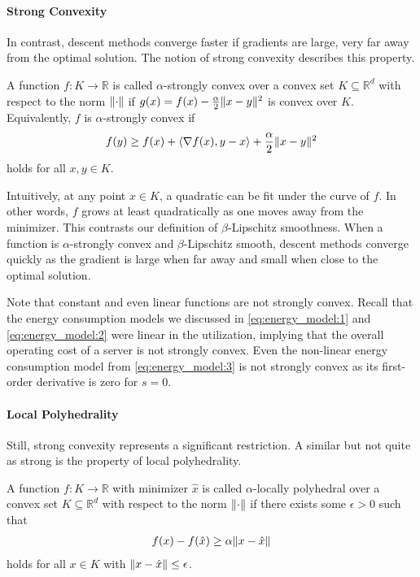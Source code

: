 \paragraph{Strong Convexity} In contrast, descent methods converge faster if gradients are large, very far away from the optimal solution. The notion of strong convexity describes this property.

\begin{definition}
\cite{Gupta2020} A function $f : K \to \mathbb{R}$ is called $\alpha$-strongly convex over a convex set $K \subseteq \mathbb{R}^d$ with respect to the norm $\lVert\cdot\rVert$ if $g(x) = f(x) - \frac{\alpha}{2}\lVert x-y\rVert^2$ is convex over $K$. Equivalently, $f$ is $\alpha$-strongly convex if \begin{align*}
    f(y) \geq f(x) + \langle\nabla f(x), y-x\rangle + \frac{\alpha}{2}\lVert x-y\rVert^2
\end{align*} holds for all $x, y \in K$.
\end{definition}

Intuitively, at any point $x \in K$, a quadratic can be fit under the curve of $f$. In other words, $f$ grows at least quadratically as one moves away from the minimizer. This contrasts our definition of $\beta$-Lipschitz smoothness. When a function is $\alpha$-strongly convex and $\beta$-Lipschitz smooth, descent methods converge quickly as the gradient is large when far away and small when close to the optimal solution.

Note that constant and even linear functions are not strongly convex. Recall that the energy consumption models we discussed in \cref{eq:energy_model:1} and \cref{eq:energy_model:2} were linear in the utilization, implying that the overall operating cost of a server is not strongly convex. Even the non-linear energy consumption model from \cref{eq:energy_model:3} is not strongly convex as its first-order derivative is zero for $s = 0$.

\paragraph{Local Polyhedrality} Still, strong convexity represents a significant restriction. A similar but not quite as strong is the property of local polyhedrality.

\begin{definition}
\cite{Goel2018} A function $f : K \to \mathbb{R}$ with minimizer $\hat{x}$ is called $\alpha$-locally polyhedral over a convex set $K \subseteq \mathbb{R}^d$ with respect to the norm $\lVert\cdot\rVert$ if there exists some $\epsilon > 0$ such that \begin{align*}
    f(x) - f(\hat{x}) \geq \alpha \lVert x - \hat{x}\rVert
\end{align*} holds for all $x \in K$ with $\lVert x - \hat{x}\rVert \leq \epsilon$.
\end{definition}

